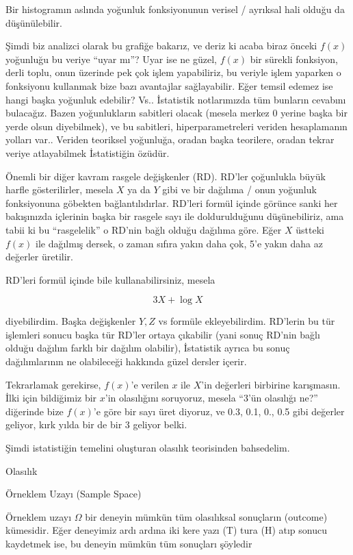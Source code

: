\documentclass[12pt,fleqn]{article}\usepackage{../../common}
\begin{document}
Bir histogramın aslında yoğunluk fonksiyonunun verisel / ayrıksal hali
olduğu da düşünülebilir.

Şimdi biz analizci olarak bu grafiğe bakarız, ve deriz ki acaba biraz
önceki $f(x)$ yoğunluğu bu veriye ``uyar mı''? Uyar ise ne güzel, $f(x)$
bir sürekli fonksiyon, derli toplu, onun üzerinde pek çok işlem
yapabiliriz, bu veriyle işlem yaparken o fonksiyonu kullanmak bize bazı
avantajlar sağlayabilir. Eğer temsil edemez ise hangi başka yoğunluk
edebilir?  Vs..  İstatistik notlarımızda tüm bunların cevabını
bulacağız. Bazen yoğunlukların sabitleri olacak (mesela merkez 0 yerine
başka bir yerde olsun diyebilmek), ve bu sabitleri, hiperparametreleri
veriden hesaplamanın yolları var.. Veriden teoriksel yoğunluğa, oradan
başka teorilere, oradan tekrar veriye atlayabilmek İstatistiğin özüdür.

Önemli bir diğer kavram rasgele değişkenler (RD). RD'ler çoğunlukla büyük harfle
gösterilirler, mesela $X$ ya da $Y$ gibi ve bir dağılıma / onun yoğunluk
fonksiyonuna göbekten bağlantılıdırlar. RD'leri formül içinde görünce sanki her
bakışınızda içlerinin başka bir rasgele sayı ile doldurulduğunu düşünebiliriz,
ama tabii ki bu ``rasgelelik'' o RD'nin bağlı olduğu dağılıma göre. Eğer $X$
üstteki $f(x)$ ile dağılmış dersek, o zaman sıfıra yakın daha çok, 5'e yakın
daha az değerler üretilir.

RD'leri formül içinde bile kullanabilirsiniz, mesela 

$$ 3X + \log X $$ 

diyebilirdim. Başka değişkenler $Y,Z$ vs formüle ekleyebilirdim. RD'lerin
bu tür işlemleri sonucu başka tür RD'ler ortaya çıkabilir (yani sonuç
RD'nin bağlı olduğu dağılım farklı bir dağılım olabilir), İstatistik ayrıca
bu sonuç dağılımlarının ne olabileceği hakkında güzel dersler içerir.

Tekrarlamak gerekirse, $f(x)$'e verilen $x$ ile $X$'in değerleri birbirine
karışmasın. İlki için bildiğimiz bir $x$'in olasılığını soruyoruz, mesela
``3'ün olasılığı ne?'' diğerinde bize $f(x)$'e göre bir sayı üret diyoruz,
ve 0.3, 0.1, 0., 0.5 gibi değerler geliyor, kırk yılda bir de bir 3 geliyor
belki.

Şimdi istatistiğin temelini oluşturan olasılık teorisinden bahsedelim.

Olasılık

Örneklem Uzayı (Sample Space)

Örneklem uzayı $\Omega$ bir deneyin mümkün tüm olasılıksal sonuçların
(outcome) kümesidir. Eğer deneyimiz ardı ardına iki kere yazı (T) tura (H)
atıp sonucu kaydetmek ise, bu deneyin mümkün tüm sonuçları şöyledir
\end{document}
